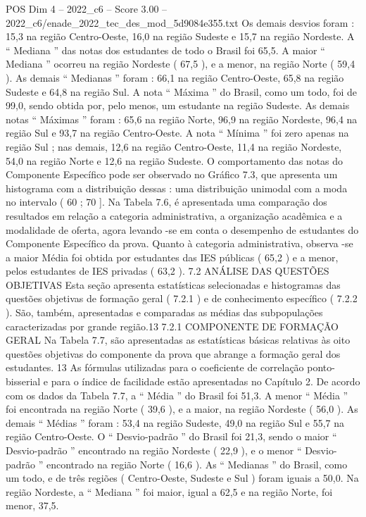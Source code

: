 \begin{textsample}{POS Dim 4 – 2022\_c6 – Score 3.00 – 2022\_c6/enade\_2022\_tec\_des\_mod\_5d9084e355.txt}
Os demais desvios foram : 15,3 na região Centro-Oeste, 16,0 na região Sudeste e 15,7 na região Nordeste.
A “ Mediana ” das notas dos estudantes de todo o Brasil foi 65,5.
A maior “ Mediana ” ocorreu na região Nordeste ( 67,5 ), e a menor, na região Norte ( 59,4 ).
As demais “ Medianas ” foram : 66,1 na região Centro-Oeste, 65,8 na região Sudeste e 64,8 na região Sul.
A nota “ Máxima ” do Brasil, como um todo, foi de 99,0, sendo obtida por, pelo menos, um estudante na região Sudeste.
As demais notas “ Máximas ” foram : 65,6 na região Norte, 96,9 na região Nordeste, 96,4 na região Sul e 93,7 na região Centro-Oeste.
A nota “ Mínima ” foi zero apenas na região Sul ; nas demais, 12,6 na região Centro-Oeste, 11,4 na região Nordeste, 54,0 na região Norte e 12,6 na região Sudeste.
O comportamento das notas do Componente Específico pode ser observado no Gráfico 7.3, que apresenta um histograma com a distribuição dessas : uma distribuição unimodal com a moda no intervalo ( 60 ; 70 ].
Na Tabela 7.6, é apresentada uma comparação dos resultados em relação a categoria administrativa, a organização acadêmica e a modalidade de oferta, agora levando -se em conta o desempenho de estudantes do Componente Específico da prova.
Quanto à categoria administrativa, observa -se a maior Média foi obtida por estudantes das IES públicas ( 65,2 ) e a menor, pelos estudantes de IES privadas ( 63,2 ). 7.2 ANÁLISE DAS QUESTÕES OBJETIVAS Esta seção apresenta estatísticas selecionadas e histogramas das questões objetivas de formação geral ( 7.2.1 ) e de conhecimento específico ( 7.2.2 ).
São, também, apresentadas e comparadas as médias das subpopulações caracterizadas por grande região.13 7.2.1 COMPONENTE DE FORMAÇÃO GERAL Na Tabela 7.7, são apresentadas as estatísticas básicas relativas às oito questões objetivas do componente da prova que abrange a formação geral dos estudantes. 13 As fórmulas utilizadas para o coeficiente de correlação ponto-bisserial e para o índice de facilidade estão apresentadas no Capítulo 2.
De acordo com os dados da Tabela 7.7, a “ Média ” do Brasil foi 51,3.
A menor “ Média ” foi encontrada na região Norte ( 39,6 ), e a maior, na região Nordeste ( 56,0 ).
As demais “ Médias ” foram : 53,4 na região Sudeste, 49,0 na região Sul e 55,7 na região Centro-Oeste.
O “ Desvio-padrão ” do Brasil foi 21,3, sendo o maior “ Desvio-padrão ” encontrado na região Nordeste ( 22,9 ), e o menor “ Desvio-padrão ” encontrado na região Norte ( 16,6 ).
As “ Medianas ” do Brasil, como um todo, e de três regiões ( Centro-Oeste, Sudeste e Sul ) foram iguais a 50,0.
Na região Nordeste, a “ Mediana ” foi maior, igual a 62,5 e na região Norte, foi menor, 37,5.

\end{textsample}
